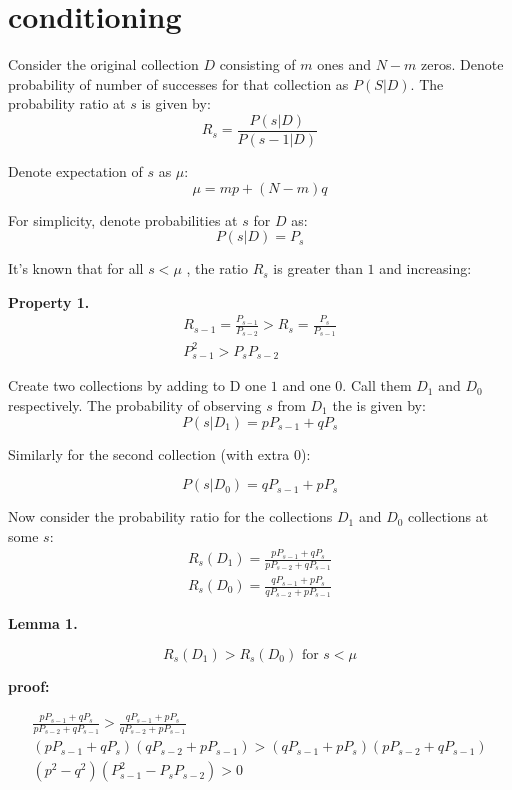 \documentclass[11pt,draft]{article}
\title{}
\begin{document}
\maketitle

\section{conditioning}

Consider the original collection $D$ consisting of $m$ ones and $N-m$ zeros.  Denote probability of number of successes for that collection as $P(S|D)$.
The probability ratio at $s$  is given by:
\[ R_s = \frac{P(s|D)}{P(s-1|D)} \] 

Denote expectation of $s$ as $\mu$:
\[ \mu = mp + (N-m)q \]

For simplicity, denote probabilities at $s$ for $D$ as:
\[ P(s|D) = P_{s} \]

It's known that for all $s < \mu$ , the ratio $R_s$ is greater than $1$ and increasing:

\textbf{Property 1.}
\begin{align}
R_{s-1} = \frac{P_{s-1}}{P_{s-2}} > R_s  = \frac{P_{s}}{P_{s-1}} \\
P^2_{s-1} > P_sP_{s-2} 
\end{align}

Create two collections by adding to D one $1$ and one $0$.  Call them $D_1$ and $D_0$ respectively. The probability of observing $s$ from $D_1$ the is given by:
\[ P(s | D_1) = pP_{s-1} + qP_s \]

Similarly for the second collection (with extra 0):

\[ P(s | D_0) = qP_{s-1} + pP_s \]

Now consider the probability ratio for the collections $D_1$ and $D_0$ collections at some $s$:
\begin{align}
R_s(D_1) = \frac{ pP_{s-1} + qP_s }{pP_{s-2} + qP_{s-1}} \\
R_s(D_0) = \frac{ qP_{s-1} + pP_s }{qP_{s-2} + pP_{s-1}}
\end{align}



\textbf{Lemma 1.}

\[ R_s(D_1) > R_s(D_0)  \text{ for } s< \mu \]

\textbf{proof:}
 
\begin{align}
 \frac{ pP_{s-1} + qP_s }{pP_{s-2} + qP_{s-1}} > \frac{ qP_{s-1} + pP_s }{qP_{s-2} + pP_{s-1}} \\
 ( pP_{s-1} + qP_s)(qP_{s-2} + pP_{s-1}) > (qP_{s-1} + pP_s)(pP_{s-2} + qP_{s-1}) \\
 (p^2 - q^2 )(P^2_{s-1} - P_sP_{s-2}) > 0
\end{align}
\end{document}
